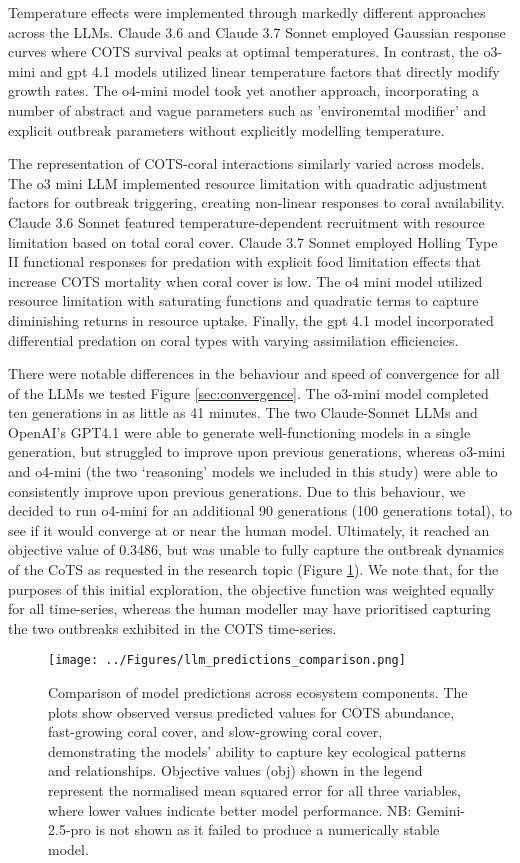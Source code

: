 Temperature effects were implemented through markedly different approaches across the LLMs. Claude 3.6 and Claude 3.7 Sonnet employed Gaussian response curves where COTS survival peaks at optimal temperatures. In contrast, the o3-mini and gpt 4.1 models utilized linear temperature factors that directly modify growth rates. The o4-mini model took yet another approach, incorporating a number of abstract and vague parameters such as 'environemtal modifier' and explicit outbreak parameters without explicitly modelling temperature.

The representation of COTS-coral interactions similarly varied across models. The o3 mini LLM implemented resource limitation with quadratic adjustment factors for outbreak triggering, creating non-linear responses to coral availability. Claude 3.6 Sonnet featured temperature-dependent recruitment with resource limitation based on total coral cover. Claude 3.7 Sonnet employed Holling Type II functional responses for predation with explicit food limitation effects that increase COTS mortality when coral cover is low. The o4 mini model utilized resource limitation with saturating functions and quadratic terms to capture diminishing returns in resource uptake. Finally, the gpt 4.1 model incorporated differential predation on coral types with varying assimilation efficiencies.

There were notable differences in the behaviour and speed of convergence for all of the LLMs we tested Figure \ref{sec:convergence}. The o3-mini model completed ten generations in as little as 41 minutes. The two Claude-Sonnet LLMs and OpenAI's GPT4.1 were able to generate well-functioning models in a single generation, but struggled to improve upon previous generations, whereas o3-mini and o4-mini (the two `reasoning' models we included in this study) were able to consistently improve upon previous generations. Due to this behaviour, we decided to run o4-mini for an additional 90 generations (100 generations total), to see if it would converge at or near the human model. Ultimately, it reached an objective value of 0.3486, but was unable to fully capture the outbreak dynamics of the CoTS as requested in the research topic (Figure \ref{fig:llm_comparison}). We note that, for the purposes of this initial exploration, the objective function was weighted equally for all time-series, whereas the human modeller may have prioritised capturing the two outbreaks exhibited in the COTS time-series. 

\begin{figure}[H]
    \centering
    \texttt{[image: ../Figures/llm\_predictions\_comparison.png]}
    \caption{Comparison of model predictions across ecosystem components. The plots show observed versus predicted values for COTS abundance, fast-growing coral cover, and slow-growing coral cover, demonstrating the models' ability to capture key ecological patterns and relationships. Objective values (obj) shown in the legend represent the normalised mean squared error for all three variables, where lower values indicate better model performance. NB: Gemini-2.5-pro is not shown as it failed to produce a numerically stable model.}
    \label{fig:llm_comparison}
    \end{figure}
    

